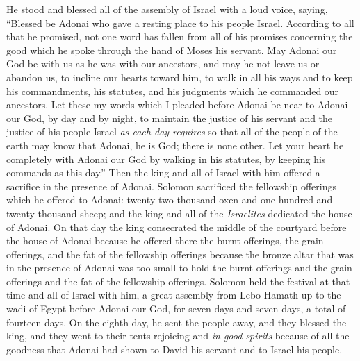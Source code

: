 \begin{biblechapter}
\verse He stood and blessed all of the assembly of Israel with a loud voice, saying,
\verse “Blessed be Adonai who gave a resting place to his people Israel. According to all that he promised, not one word has fallen from all of his promises concerning the good which he spoke through the hand of Moses his servant.
\verse May Adonai our God be with us as he was with our ancestors, and may he not leave us or abandon us,
\verse to incline our hearts toward him, to walk in all his ways and to keep his commandments, his statutes, and his judgments which he commanded our ancestors.
\verse Let these my words which I pleaded before Adonai be near to Adonai our God, by day and by night, to maintain the justice of his servant and the justice of his people Israel \textit{as each day requires}
\verse so that all of the people of the earth may know that Adonai, he is God; there is none other.
\verse Let your heart be completely with Adonai our God by walking in his statutes, by keeping his commands as this day.”
 Then the king and all of Israel with him offered a sacrifice in the presence of Adonai.
\verse Solomon sacrificed the fellowship offerings which he offered to Adonai: twenty-two thousand oxen and one hundred and twenty thousand sheep; and the king and all of the \textit{Israelites} dedicated the house of Adonai.
\verse On that day the king consecrated the middle of the courtyard before the house of Adonai because he offered there the burnt offerings, the grain offerings, and the fat of the fellowship offerings because the bronze altar that was in the presence of Adonai was too small to hold the burnt offerings and the grain offerings and the fat of the fellowship offerings.
\verse Solomon held the festival at that time and all of Israel with him, a great assembly from Lebo Hamath up to the wadi of Egypt before Adonai our God, for seven days and seven days, a total of fourteen days.
\verse On the eighth day, he sent the people away, and they blessed the king, and they went to their tents rejoicing and \textit{in good spirits} because of all the goodness that Adonai had shown to David his servant and to Israel his people.
\end{biblechapter}

